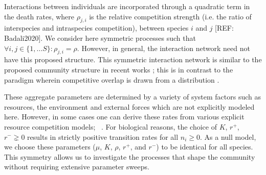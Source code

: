 \documentclass[9pt,twocolumn,twoside,lineno]{pnas-new}
\begin{document}
Interactions between individuals are incorporated through a quadratic term in the death rates, where $\rho_{j,i}$ is the relative competition strength (i.e. the ratio of interspecies and intraspecies competition), between species $i$ and $j$ \cite{haegeman2011mathematical, badali2020effects}[REF: Badali2020].
We consider here symmetric processes such that $\forall i,j\in \{1,\dots S\}:\rho_{j,i}=\rho$. 
However, in general, the interaction network need not have this proposed structure.
This symmetric interaction network is similar to the proposed community structure in recent works \cite{capitan2017stochastic,capitan2020competitive,haegeman2011mathematical}; this is in contrast to the paradigm wherein competitive overlap is drawn from a distribution \cite{fisher2014transition,allesina2012stability}.

These aggregate  parameters are determined by a variety of system factors such as resources, the environment and external forces which are not explicitly modeled here.
However, in some cases one can derive these rates from various explicit resource competition models; %
~\cite{macArthur1970species,chesson1990macarthur,o2018whence}.
For biological reasons, the choice of $K$, $r^+$, $r^- \gneq 0$ results in strictly positive transition rates for all $ n_i\geq 0$.
As a null model, we choose these parameters ($\mu$, $K$, $\rho$, $r^+$, and $r^-$) to be identical for all species.
This symmetry allows us to investigate the processes that shape the community without requiring extensive parameter sweeps.
\end{document}
